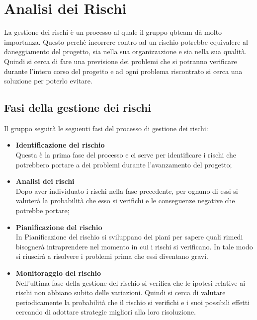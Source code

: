 \section{Analisi dei Rischi}
La gestione dei rischi è un processo al quale il gruppo qbteam dà molto importanza. Questo perchè incorrere contro ad un rischio potrebbe equivalere al daneggiamento del progetto, sia nella sua organizzazione e sia nella sua qualità.
Quindi si cerca di fare una previsione dei problemi che si potranno verificare durante l'intero corso del progetto e ad ogni problema riscontrato si cerca una soluzione per poterlo evitare.

\subsection{Fasi della gestione dei rischi}
Il gruppo seguirà le seguenti fasi del processo di gestione dei rischi:
\begin{itemize}
	\item \textbf{Identificazione del rischio}
	\\ Questa è la prima fase del processo e ci serve per identificare i rischi che potrebbero portare a dei problemi durante l'avanzamento del progetto; 
\end{itemize}
\begin{itemize}
	\item \textbf{Analisi dei rischi}
	\\ Dopo aver individuato i rischi nella fase precedente, per ognuno di essi si valuterà la probabilità che esso si verifichi e le conseguenze negative che potrebbe portare;
\end{itemize}
\begin{itemize}
	\item \textbf{Pianificazione del rischio}
	\\ In Pianificazione del rischio si sviluppano dei piani per sapere quali rimedi bisognerà intraprendere nel momento in cui i rischi si verificano. In tale modo si riuscirà a risolvere i problemi prima che essi diventano gravi.
\end{itemize}
\begin{itemize}
	\item \textbf{Monitoraggio del rischio} 
	\\ Nell'ultima fase della gestione del rischio si verifica che le ipotesi relative ai rischi non abbiano subito delle variazioni. Quindi si cerca di valutare periodicamente la probabilità che il rischio si verifichi e i suoi possibili effetti cercando di adottare strategie migliori alla loro risoluzione.
\end{itemize}

